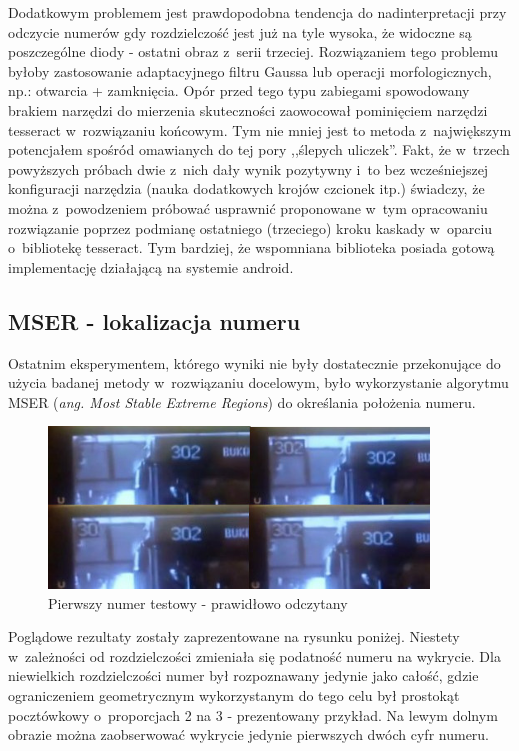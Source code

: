 Dodatkowym problemem jest prawdopodobna tendencja do nadinterpretacji
przy odczycie numerów gdy rozdzielczość jest już na tyle wysoka, że
widoczne są poszczególne diody - ostatni obraz z~serii trzeciej.
Rozwiązaniem tego problemu byłoby zastosowanie adaptacyjnego filtru
Gaussa lub operacji morfologicznych, np.: otwarcia + zamknięcia.
Opór przed tego typu zabiegami spowodowany brakiem narzędzi 
do mierzenia skuteczności zaowocował pominięciem narzędzi tesseract
w~rozwiązaniu końcowym. Tym nie mniej jest to metoda z~największym
potencjałem spośród omawianych do tej pory ,,ślepych uliczek''. 
Fakt, że w~trzech powyższych próbach dwie z~nich dały wynik pozytywny
i~to bez wcześniejszej konfiguracji narzędzia (nauka dodatkowych
krojów czcionek itp.) świadczy, że można z~powodzeniem próbować
usprawnić proponowane w~tym opracowaniu rozwiązanie poprzez 
podmianę ostatniego (trzeciego) kroku kaskady w~oparciu o~bibliotekę
tesseract. Tym bardziej, że wspomniana biblioteka posiada gotową
implementację działającą na systemie android.

\subsection{MSER - lokalizacja numeru}

Ostatnim eksperymentem, którego wyniki nie były dostatecznie przekonujące
do użycia badanej metody w~rozwiązaniu docelowym, było
wykorzystanie algorytmu MSER (\textit{ang. Most Stable Extreme Regions})
do określania położenia numeru.

\begin{figure}[h!]
    \caption{Pierwszy numer testowy - prawidłowo odczytany}
    \centering
    \includegraphics[width=0.9\textwidth]{img/exp_mser_concerns}
\end{figure}

Poglądowe rezultaty zostały zaprezentowane na rysunku poniżej. 
Niestety w~zależności od rozdzielczości zmieniała się podatność
numeru na wykrycie. Dla niewielkich rozdzielczości numer był rozpoznawany
jedynie jako całość, gdzie ograniczeniem geometrycznym wykorzystanym
do tego celu był prostokąt pocztówkowy o~proporcjach 2 na 3 - prezentowany
przykład. Na lewym dolnym obrazie można zaobserwować wykrycie jedynie
pierwszych dwóch cyfr numeru.

